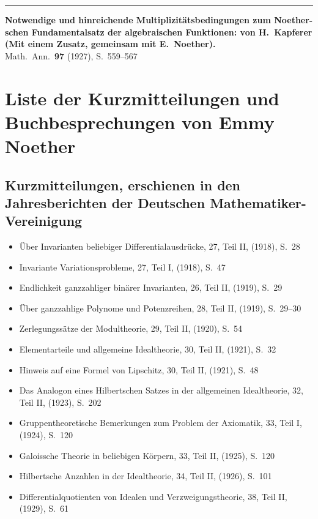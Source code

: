 \documentclass[12pt,a4paper]{article}
\theoremstyle{plain}
\theoremstyle{definition}
\theoremstyle{remark}
\begin{document}
\vspace{1em}
\noindent\rule{\textwidth}{0.4pt}
\vspace{0.5em}

\noindent\textbf{Notwendige und hinreichende Multiplizit\"atsbedingungen zum Noether-}\\
\textbf{schen Fundamentalsatz der algebraischen Funktionen: von H.\ Kapferer}\\
\textbf{(Mit einem Zusatz, gemeinsam mit E.\ Noether).}\\
Math.\ Ann.\ \textbf{97} (1927), S.~559--567

\newpage
\section*{Liste der Kurzmitteilungen und Buchbesprechungen von Emmy Noether}

\subsection*{Kurzmitteilungen, erschienen in den Jahresberichten der Deutschen Mathematiker-Vereinigung}

\begin{itemize}[leftmargin=1.5em,itemsep=0.2em]
\item \"Uber Invarianten beliebiger Differentialausdr\"ucke, 27, Teil II, (1918), S.~28
\item Invariante Variationsprobleme, 27, Teil I, (1918), S.~47
\item Endlichkeit ganzzahliger bin\"arer Invarianten, 26, Teil II, (1919), S.~29
\item \"Uber ganzzahlige Polynome und Potenzreihen, 28, Teil II, (1919), S.~29--30
\item Zerlegungss\"atze der Modultheorie, 29, Teil II, (1920), S.~54
\item Elementarteile und allgemeine Idealtheorie, 30, Teil II, (1921), S.~32
\item Hinweis auf eine Formel von Lipschitz, 30, Teil II, (1921), S.~48
\item Das Analogon eines Hilbertschen Satzes in der allgemeinen Idealtheorie,
32, Teil II, (1923), S.~202
\item Gruppentheoretische Bemerkungen zum Problem der Axiomatik, 33,
Teil I, (1924), S.~120
\item Galoissche Theorie in beliebigen K\"orpern, 33, Teil II, (1925), S.~120
\item Hilbertsche Anzahlen in der Idealtheorie, 34, Teil II, (1926), S.~101
\item Differentialquotienten von Idealen und Verzweigungstheorie, 38, Teil II,
(1929), S.~61
\end{itemize}
\end{document}
